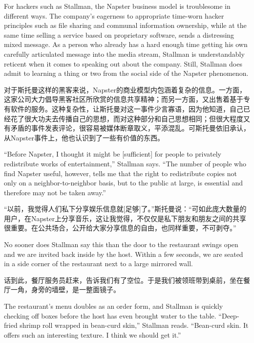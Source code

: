 \ifdefined\eng
For hackers such as Stallman, the Napster business model is troublesome in different ways. The company's eagerness to appropriate time-worn hacker principles such as file sharing and communal information ownership, while at the same time selling a service based on proprietary software, sends a distressing mixed message. As a person who already has a hard enough time getting his own carefully articulated message into the media stream, Stallman is understandably reticent when it comes to speaking out about the company. Still, Stallman does admit to learning a thing or two from the social side of the Napster phenomenon.
\fi

\ifdefined\chs
对于斯托曼这样的黑客来说，Napster的商业模型内包涵着复杂的信息。一方面，这家公司大力倡导黑客社区所欣赏的信息共享精神；而另一方面，又出售着基于专有软件的服务。这种复杂性，让斯托曼对这一事件少言寡语，因为他知道，自己已经花了很大功夫去传播自己的思想，而对这种部分和自己思想相同；但很大程度又有矛盾的事件发表评论，很容易被媒体断章取义，平添混乱。可斯托曼依旧承认，从Napster事件上，他也认识到了一些有价值的东西。
\fi

\ifdefined\eng
``Before Napster, I thought it might be [sufficient] for people to privately redistribute works of entertainment,'' Stallman says. ``The number of people who find Napster useful, however, tells me that the right to redistribute copies not only on a neighbor-to-neighbor basis, but to the public at large, is essential and therefore may not be taken away.''
\fi

\ifdefined\chs
``以前，我觉得人们私下分享娱乐信息就[足够]了。''斯托曼说：``可如此庞大数量的用户，在Napster上分享音乐，这让我觉得，不仅仅是私下朋友和朋友之间的共享很重要。在公共场合，公开给大家分享信息的自由，也同样重要，不可剥夺。''
\fi

\ifdefined\eng
No sooner does Stallman say this than the door to the restaurant swings open and we are invited back inside by the host. Within a few seconds, we are seated in a side corner of the restaurant next to a large mirrored wall.
\fi

\ifdefined\chs
话到此，餐厅服务员赶来，告诉我们有了空位。于是我们被领班带到桌前，坐在餐厅一角，身旁的墙壁，是一整面镜子。
\fi

\ifdefined\eng
The restaurant's menu doubles as an order form, and Stallman is quickly checking off boxes before the host has even brought water to the table. ``Deep-fried shrimp roll wrapped in bean-curd skin,'' Stallman reads. ``Bean-curd skin. It offers such an interesting texture. I think we should get it.''
\fi

